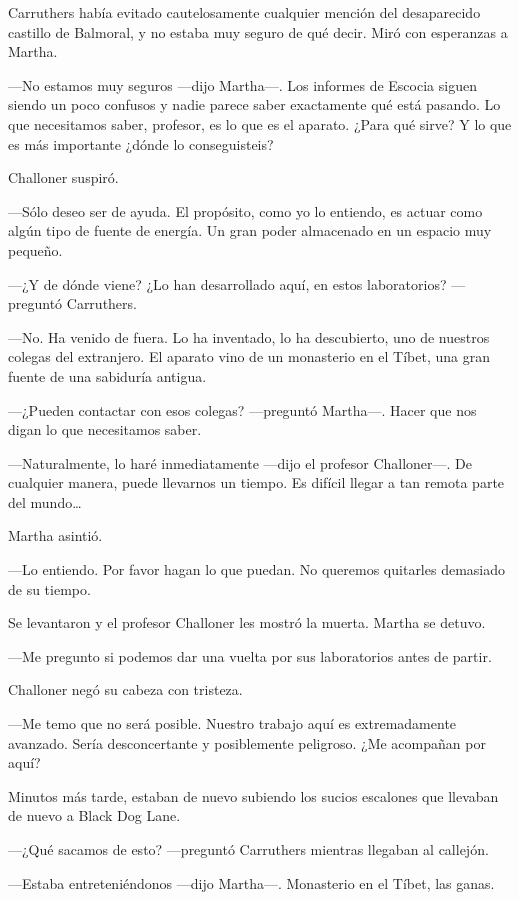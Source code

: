 Carruthers había evitado cautelosamente cualquier mención del
desaparecido castillo de Balmoral, y no estaba muy seguro de qué decir.
Miró con esperanzas a Martha.

---No estamos muy seguros ---dijo Martha---. Los informes de Escocia
siguen siendo un poco confusos y nadie parece saber exactamente qué está
pasando. Lo que necesitamos saber, profesor, es lo que es el aparato.
¿Para qué sirve? Y lo que es más importante ¿dónde lo conseguisteis?

Challoner suspiró.

---Sólo deseo ser de ayuda. El propósito, como yo lo entiendo, es actuar
como algún tipo de fuente de energía. Un gran poder almacenado en un
espacio muy pequeño.

---¿Y de dónde viene? ¿Lo han desarrollado aquí, en estos laboratorios?
---preguntó Carruthers.

---No. Ha venido de fuera. Lo ha inventado, lo ha descubierto, uno de
nuestros colegas del extranjero. El aparato vino de un monasterio en el
Tíbet, una gran fuente de una sabiduría antigua.

---¿Pueden contactar con esos colegas? ---preguntó Martha---. Hacer que
nos digan lo que necesitamos saber.

---Naturalmente, lo haré inmediatamente ---dijo el profesor
Challoner---. De cualquier manera, puede llevarnos un tiempo. Es difícil
llegar a tan remota parte del mundo\ldots{}

Martha asintió.

---Lo entiendo. Por favor hagan lo que puedan. No queremos quitarles
demasiado de su tiempo.

Se levantaron y el profesor Challoner les mostró la muerta. Martha se
detuvo.

---Me pregunto si podemos dar una vuelta por sus laboratorios antes de
partir.

Challoner negó su cabeza con tristeza.

---Me temo que no será posible. Nuestro trabajo aquí es extremadamente
avanzado. Sería desconcertante y posiblemente peligroso. ¿Me acompañan
por aquí?

Minutos más tarde, estaban de nuevo subiendo los sucios escalones que
llevaban de nuevo a Black Dog Lane.

---¿Qué sacamos de esto? ---preguntó Carruthers mientras llegaban al
callejón.

---Estaba entreteniéndonos ---dijo Martha---. Monasterio en el Tíbet,
las ganas.

